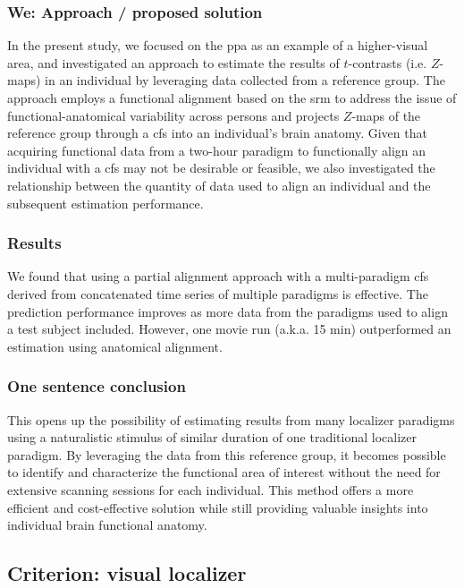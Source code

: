 \subsubsection{We: Approach / proposed solution}
%
In the present study, we focused on the \ac{ppa} as an example of a
higher-visual area, and investigated an approach to estimate the results of
$t$-contrasts (i.e. $Z$-maps) in an individual by leveraging data collected from
a reference group.
%
The approach employs a functional alignment based on the \acf{srm}
\citep{chen2015reduced} to address the issue of functional-anatomical
variability across persons and projects $Z$-maps of the reference group through
a \ac{cfs} into an individual's brain anatomy.
%
Given that acquiring functional data from a two-hour paradigm to functionally
align an individual with a \ac{cfs} may not be desirable or feasible, we also
investigated the relationship between the quantity of data used to align an
individual and the subsequent estimation performance.


\subsubsection{Results}

%
We found that using a partial alignment approach with a multi-paradigm \ac{cfs}
derived from concatenated time series of multiple paradigms is effective.
%
The prediction performance improves as more data from the paradigms used to
align a test subject included.
%
However, one movie run (a.k.a. 15 min) outperformed an estimation using
anatomical alignment.



\subsubsection{One sentence conclusion}

%
This opens up the possibility of estimating results from many localizer
paradigms using a naturalistic stimulus of similar duration of one traditional
localizer paradigm.
%
By leveraging the data from this reference
group, it becomes possible to identify and characterize the functional area of
interest without the need for extensive scanning sessions for each individual.
%
This method offers a more efficient and cost-effective solution while still
providing valuable insights into individual brain functional anatomy.



\subsection{Criterion: visual localizer}

